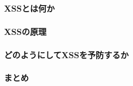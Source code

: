 
\subsubsection{XSSとは何か}

\subsubsection{XSSの原理}

\subsubsection{どのようにしてXSSを予防するか}

\subsubsection{まとめ}

